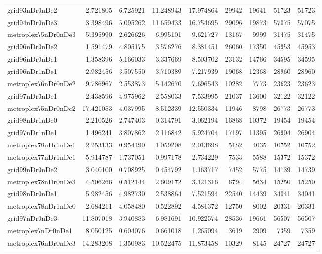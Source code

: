 \begin{longtable}{|l|r|r|r|r|r|r|r|r|}
grid93nDr0nDe2 & 2.721805 & 6.725921 & 11.248943 & 17.974864 & 29942 & 19641 & 51723 & 51723 \\
grid94nDr0nDe3 & 3.398496 & 5.095262 & 11.659433 & 16.754695 & 29096 & 19873 & 57075 & 57075 \\
metroplex75nDr0nDe3 & 5.395990 & 2.626626 & 6.995101 & 9.621727 & 13167 & 9999 & 31475 & 31475 \\
grid96nDr0nDe2 & 1.591479 & 4.805175 & 3.576276 & 8.381451 & 26060 & 17350 & 45953 & 45953 \\
grid96nDr0nDe1 & 1.358396 & 5.166033 & 3.337669 & 8.503702 & 23132 & 14766 & 34595 & 34595 \\
grid96nDr1nDe1 & 2.982456 & 3.507550 & 3.710389 & 7.217939 & 19068 & 12368 & 28960 & 28960 \\
metroplex76nDr0nDe2 & 9.786967 & 2.553873 & 5.142670 & 7.696543 & 10282 & 7773 & 23623 & 23623 \\
grid97nDr0nDe1 & 2.438596 & 4.975962 & 2.558033 & 7.533995 & 21037 & 13600 & 32122 & 32122 \\
metroplex75nDr0nDe2 & 17.421053 & 4.037995 & 8.512339 & 12.550334 & 11946 & 8798 & 26773 & 26773 \\
grid98nDr1nDe0 & 2.210526 & 2.747403 & 0.314791 & 3.062194 & 16868 & 10372 & 19454 & 19454 \\
grid97nDr1nDe1 & 1.496241 & 3.807862 & 2.116842 & 5.924704 & 17197 & 11395 & 26904 & 26904 \\
metroplex78nDr1nDe1 & 2.253133 & 0.954490 & 1.059208 & 2.013698 & 5182 & 4035 & 10752 & 10752 \\
metroplex77nDr1nDe1 & 5.914787 & 1.737051 & 0.997178 & 2.734229 & 7533 & 5588 & 15372 & 15372 \\
grid99nDr0nDe2 & 3.040100 & 0.708925 & 0.454792 & 1.163717 & 7452 & 5775 & 14739 & 14739 \\
metroplex78nDr0nDe3 & 4.506266 & 0.512144 & 2.609172 & 3.121316 & 6794 & 5634 & 15250 & 15250 \\
grid98nDr0nDe1 & 5.982456 & 4.982730 & 2.538864 & 7.521594 & 22540 & 14439 & 34041 & 34041 \\
metroplex78nDr1nDe0 & 2.684211 & 4.058480 & 0.522892 & 4.581372 & 12750 & 8002 & 20331 & 20331 \\
grid97nDr0nDe3 & 11.807018 & 3.940883 & 6.981691 & 10.922574 & 28536 & 19661 & 56507 & 56507 \\
metroplex7nDr0nDe1 & 8.050125 & 0.604076 & 0.661018 & 1.265094 & 3619 & 2909 & 7359 & 7359 \\
metroplex76nDr0nDe3 & 14.283208 & 1.350983 & 10.522475 & 11.873458 & 10329 & 8145 & 24727 & 24727 \\

\end{longtable}
